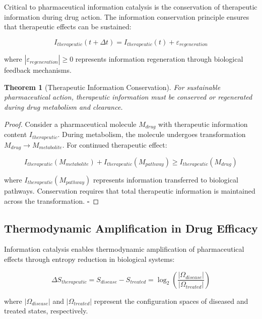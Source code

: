 \documentclass[12pt,a4paper]{article}
\newtheorem{theorem}{Theorem}[section]
\begin{document}
Critical to pharmaceutical information catalysis is the conservation of therapeutic information during drug action. The information conservation principle ensures that therapeutic effects can be sustained:

\begin{equation}
I_{therapeutic}(t + \Delta t) = I_{therapeutic}(t) + \varepsilon_{regeneration}
\end{equation}

where $|\varepsilon_{regeneration}| \geq 0$ represents information regeneration through biological feedback mechanisms.

\begin{theorem}[Therapeutic Information Conservation]
For sustainable pharmaceutical action, therapeutic information must be conserved or regenerated during drug metabolism and clearance.
\end{theorem}

\begin{proof}
Consider a pharmaceutical molecule $M_{drug}$ with therapeutic information content $I_{therapeutic}$. During metabolism, the molecule undergoes transformation $M_{drug} \rightarrow M_{metabolite}$. For continued therapeutic effect:

$$I_{therapeutic}(M_{metabolite}) + I_{therapeutic}(M_{pathway}) \geq I_{therapeutic}(M_{drug})$$

where $I_{therapeutic}(M_{pathway})$ represents information transferred to biological pathways. Conservation requires that total therapeutic information is maintained across the transformation. $\square$
\end{proof}

\subsection{Thermodynamic Amplification in Drug Efficacy}

Information catalysis enables thermodynamic amplification of pharmaceutical effects through entropy reduction in biological systems:

\begin{equation}
\Delta S_{therapeutic} = S_{disease} - S_{treated} = \log_2\left(\frac{|\Omega_{disease}|}{|\Omega_{treated}|}\right)
\end{equation}

where $|\Omega_{disease}|$ and $|\Omega_{treated}|$ represent the configuration spaces of diseased and treated states, respectively.
\end{document}

